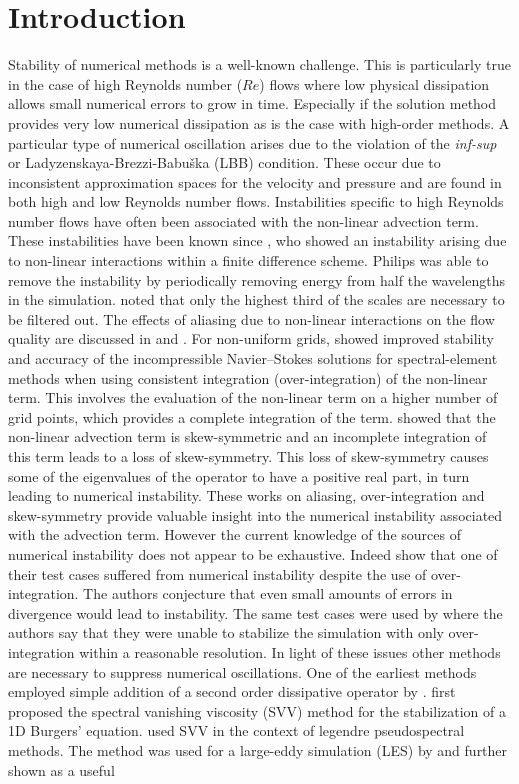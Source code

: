 
\section{Introduction}

Stability of numerical methods is a well-known challenge. This is particularly true in the case of high Reynolds number ($Re$) flows where low physical dissipation allows small numerical errors to grow in time. Especially if the solution method provides very low numerical dissipation as is the case with high-order methods. A particular type of numerical oscillation arises  due to the violation of the \emph{inf-sup} or Ladyzenskaya-Brezzi-Babu\v{s}ka (LBB) condition. These occur due to inconsistent approximation spaces for the velocity and pressure and are found in both high and low Reynolds number flows. Instabilities specific to high Reynolds number flows have often been associated with the non-linear advection term. These instabilities have been known since \cite{phillips59}, who showed an instability arising due to non-linear interactions within a finite difference scheme. Philips was able to remove the instability by periodically removing energy from half the wavelengths in the simulation. \cite{orszag71} noted that only the highest third of the scales are necessary to be filtered out. The effects of aliasing due to non-linear interactions on the flow quality are discussed in \cite{kirst87,chow03} and \cite{canuto88}. For non-uniform grids, \cite{kirby03} showed improved stability and accuracy of the incompressible Navier--Stokes solutions for spectral-element methods when using consistent integration (over-integration) of the non-linear term. This involves the evaluation of the non-linear term on a higher number of grid points, which provides a complete integration of the term. \cite{malm13} showed that the non-linear advection term is skew-symmetric and an incomplete integration of this term leads to a loss of skew-symmetry. This loss of skew-symmetry causes some of the eigenvalues of the operator to have a positive real part, in turn leading to numerical instability. These works on aliasing, over-integration and skew-symmetry provide valuable insight into the numerical instability associated with the advection term. However the current knowledge of the sources of numerical instability does not appear to be exhaustive. Indeed \cite{malm13} show that one of their test cases suffered from numerical instability despite the use of over-integration. The authors conjecture that even small amounts of errors in divergence would lead to instability. The same test cases were used by \cite{fischer01} where the authors say that they were unable to stabilize the simulation with only over-integration within a reasonable resolution. In light of these issues other methods are necessary to suppress numerical oscillations. One of the earliest methods employed simple addition of a second order dissipative operator by \cite{vonneumann50}. \cite{tadmor89} first proposed the spectral vanishing viscosity (SVV) method for the stabilization of a 1D Burgers' equation. \cite{maday93} used SVV in the context of legendre pseudospectral methods. The method was used for a large-eddy simulation (LES) by \cite{karamanos00} and further shown as a useful 